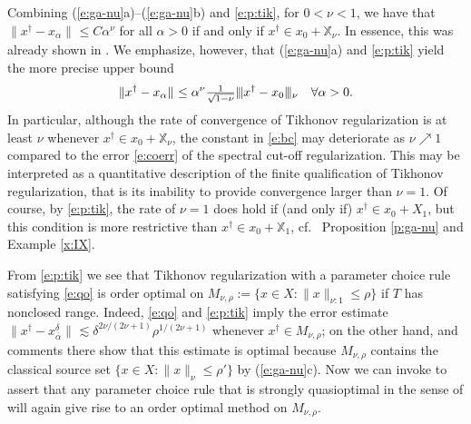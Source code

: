 \documentclass[10pt, a4paper]{iopart}
\newcommand{\IX}{\mathbb{X}}
\newcommand{\norm}[2]{     \| #1       \|_{ #2 }}
\newcommand{\normiii}[2]{\vert\kern-0.25ex\vert\kern-0.25ex\vert #1 \vert\kern-0.25ex \vert\kern-0.25ex\vert_{ #2 }}
\theoremstyle{remark}
\theoremstyle{definition}
\providecommand{\REV}[1]{{#1}}
\begin{document}
	
	Combining (\ref{e:ga-nu}a)--(\ref{e:ga-nu}b) and \eqref{e:p:tik},
	for $0 < \nu < 1$,
	we have
	that $\norm{x^\dag - x_\alpha}{} \leq C \alpha^{\nu}$ for all $\alpha > 0$
	if and only if
	$x^\dag \in x_0 + \IX_\nu$.
	In essence,
	this was already shown in \cite[Theorem 2.1]{Neubauer1997}.
	We emphasize, however,
	that (\ref{e:ga-nu}a) and \eqref{e:p:tik} yield
	the more precise upper bound
	\begin{align}
	\label{e:bc}
		\norm{x^\dag - x_\alpha}{} 
		\leq 
		\alpha^\nu \tfrac{1}{\sqrt{1 - \nu}} 
		\normiii{x^\dag - x_0}{\nu}
		\quad
		\forall \alpha > 0 
		.
	\end{align}
	In particular, 
	although the rate of convergence of Tikhonov regularization
	is at least $\nu$ whenever $x^\dag \in x_0 + \IX_\nu$,
	the constant in \eqref{e:bc} may deteriorate as $\nu \nearrow 1$
	compared to 
	the error \eqref{e:coerr}
	of the spectral cut-off regularization.
	This may be interpreted as a quantitative description of 
	the finite qualification of Tikhonov regularization,
	that is its inability to provide convergence larger than $\nu = 1$.
	Of course,
	by \eqref{e:p:tik},
	the rate of $\nu = 1$ does hold 
	if (and only if) $x^\dag \in x_0 + X_1$,
	but
	this condition is more restrictive 
	than $x^\dag \in x_0 + \IX_1$,
	cf.~%
	Proposition \ref{p:ga-nu}
	and
	Example \ref{x:IX}.
	
	


	\REV{%
	From \eqref{e:p:tik}
	we see that
	Tikhonov regularization with 
	a parameter choice rule satisfying \eqref{e:qo}
	is order optimal
	on 
	$M_{\nu,\rho} := \{ x \in X : \norm{x}{\nu:1} \leq \rho \}$
	if $T$ has nonclosed range.
	Indeed, \eqref{e:qo} and \eqref{e:p:tik}
	imply
	the error estimate
	$
		\norm{x^\dagger - x_{\bar{\alpha}}^\delta }{}
		\lesssim
		\delta^{2\nu / (2\nu + 1)}
		\rho^{1 / (2\nu + 1)}
	$
	whenever
	$x^\dagger \in M_{\nu,\rho}$;
	on the other hand,
	\cite[Prop 3.15]{EnglHankeNeubauer1996}
	and comments there
	show that
	this estimate is optimal
	because
	$M_{\nu,\rho}$ contains
	the classical source set
	$\{ x \in X : \norm{x}{\nu} \leq \rho' \}$
	by (\ref{e:ga-nu}c).
	Now we can invoke
	\cite[Thm 2.3]{RausHamarik2007}
	to assert that
	any parameter choice rule 
	that is strongly quasioptimal
	in the sense of \cite[Def 2.2]{RausHamarik2007}
	will again give rise 
	to
	an order optimal method on $M_{\nu,\rho}$.
	}%
\end{document}
